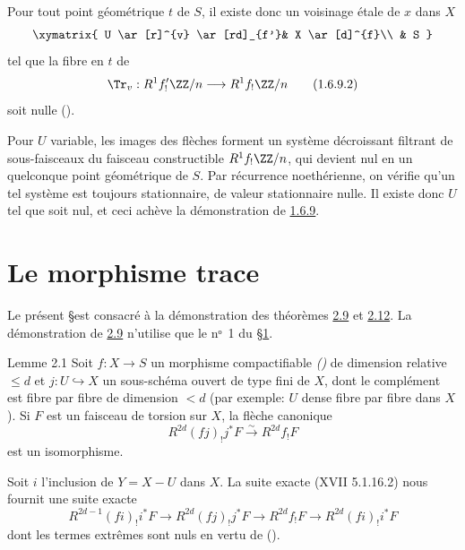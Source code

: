 Pour tout point géométrique $t$ de $S$, il existe donc un voisinage
étale de $x$ dans $X$
$$
\xymatrix{
U \ar[r]^{v} \ar[rd]_{f'}& X \ar[d]^{f}\\
  & S
}
$$
tel que la fibre en $t$ de
\begin{equation*}
\Tr_{v}:R^{1}f'_{!}\ZZ/n\longrightarrow
R^{1}f_{!}\ZZ/n\tag{1.6.9.2}
\end{equation*}%
soit nulle ().

Pour $U$ variable, les images des flèches  forment un système
décroissant filtrant de sous-faisceaux du faisceau constructible
$R^{1}f_{!}\ZZ/n$, qui devient nul en un quelconque point
géométrique de $S$. Par récurrence noethérienne, on vérifie qu'un tel
système est toujours stationnaire, de valeur stationnaire nulle. Il
existe donc $U$ tel que  soit nul, et ceci achève la
démonstration de \hyperref[XVIII.lemfond1.6.9]{1.6.9}.

\section{Le morphisme trace}\pageoriginale

Le présent \S est consacré à la démonstration des théorèmes
\hyperref[XVIII.thm2.9]{2.9} et \hyperref[XVIII.prop2.12]{2.12}. La démonstration de
\hyperref[XVIII.thm2.9]{2.9} n'utilise que le nᵒ 1 du \S \hyperref[XVIII.sec1]{1}.

\begin{enonce*}{Lemme 2.1}
Soit $f:X\rightarrow S$ un morphisme compactifiable
\emph{()} de dimension relative $\leq d$ et
$j:U\hookrightarrow X$ un sous-schéma ouvert de type fini de $X$, dont
le complément est fibre par fibre de dimension $< d$ (par exemple: $U$
dense fibre par fibre dans $X$). Si $F$ est un faisceau de torsion sur
$X$, la flèche canonique
$$
R^{2d}(fj)_{!}j^{\ast}F\xrightarrow{\sim} R^{2d}f_{!}F
$$
est un isomorphisme.
\end{enonce*}

Soit $i$ l'inclusion de $Y=X-U$ dans $X$. La suite exacte 
(XVII 5.1.16.2) nous fournit une suite exacte
$$
R^{2d-1}(fi)_{!}i^{\ast}F\longrightarrow
R^{2d}(fj)_{!}j^{\ast}F\longrightarrow R^{2d}f_{!}F\longrightarrow
R^{2d}(fi)_{!}i^{\ast}F
$$
dont les termes extrêmes sont nuls en vertu de ().

